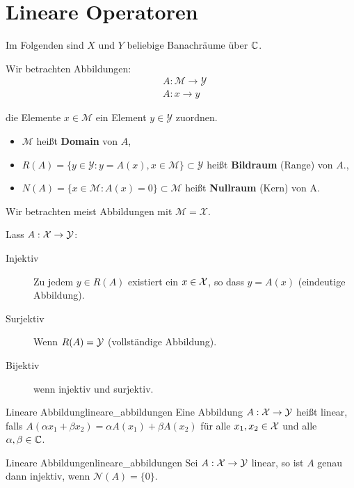 \section{Lineare Operatoren}
Im Folgenden sind $X$ und $Y$ beliebige Banachräume über $\mathbb{C}$.

Wir betrachten Abbildungen:
\begin{align*}
  &A: \mathcal{M} \to \mathcal{Y}\\
  &A: x \to y
\end{align*}

die Elemente $x \in \mathcal{M}$ ein Element $y \in \mathcal{Y}$ zuordnen.
\begin{itemize}
        \item $\mathcal{M}$ heißt \textbf{Domain} von $A$,
        \item $R(A) = \{y \in \mathcal{Y}: y = A(x), x \in \mathcal{M}\} \subset \mathcal{Y}$ heißt \textbf{Bildraum} (Range) von $A$.,
        \item $N(A) = \{x \in \mathcal{M} : A(x) = 0\} \subset \mathcal{M}$ heißt \textbf{Nullraum} (Kern) von A.
\end{itemize}

Wir betrachten meist Abbildungen mit $\mathcal{M} = \mathcal{X}$.

Lass $A : \mathcal{X} \to \mathcal{Y}$:
\begin{description}
        \item[Injektiv] Zu jedem $y \in R(A)$ existiert ein $x \in \mathcal{X}$, so dass $y = A(x)$ (eindeutige Abbildung).
        \item[Surjektiv] Wenn $R(A) = \mathcal{Y}$ (vollständige Abbildung).
        \item[Bijektiv] wenn injektiv und surjektiv.
\end{description}

\begin{boringDef}{Lineare Abbildung}{lineare_abbildungen}
  Eine Abbildung $A : \mathcal{X} \to \mathcal{Y}$ heißt linear, falls $A(\alpha x_{1} + \beta x_{2}) = \alpha A(x_{1}) + \beta A(x_{2}) $ für alle $x_{1}, x_{2} \in \mathcal{X}$ und alle $\alpha, \beta \in \mathbb{C}$.
\end{boringDef}

\begin{mytheo}{Lineare Abbildungen}{lineare_abbildungen}
  Sei $A : \mathcal{X} \to \mathcal{Y}$ linear, so ist $A$ genau dann injektiv, wenn $\mathcal{N}(A) = \{0\}$.
\end{mytheo}
